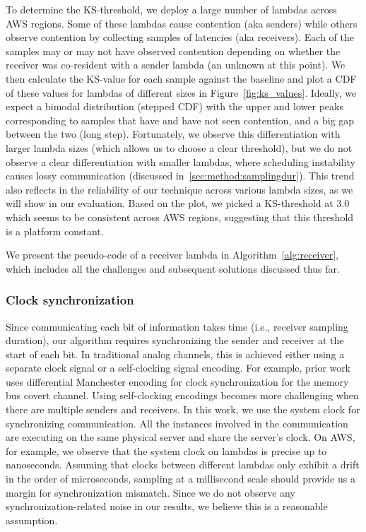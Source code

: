 To determine the KS-threshold, we deploy a large number of lambdas across AWS
regions. Some of these lambdas cause contention (aka senders) while others
observe contention by collecting samples of latencies (aka receivers). Each of
the samples may or may not have observed contention depending on whether the
receiver was co-resident with a sender lambda (an unknown at this point). We then
calculate the KS-value for each sample against the baseline and plot a CDF of
these values for lambdas of different sizes in Figure~\ref{fig:ks_values}.
Ideally, we expect a bimodal distribution (stepped CDF) with the upper and
lower peaks corresponding to samples that have and have not seen contention, and
a big gap between the two (long step). Fortunately, we observe this
differentiation with larger lambda sizes (which allows us to choose a clear
threshold), but we do not observe a clear differentiation with smaller lambdas,
where scheduling instability causes lossy communication (discussed
in~\ref{sec:method:samplingdur}).  This trend also reflects in the reliability
of our technique across various lambda sizes, as we will show in our evaluation.
Based on the plot, we picked a KS-threshold at 3.0 which seems to be consistent
across AWS regions, suggesting that this threshold is a platform constant.

We present the pseudo-code of a receiver lambda in Algorithm~\ref{alg:receiver},
which includes all the challenges and subsequent solutions discussed thus
far.

\subsubsection{Clock synchronization} 
Since communicating each bit of information takes time (i.e., receiver sampling
duration), our algorithm requires synchronizing the sender and receiver at the start
of each bit. In traditional analog channels, this is achieved either using a
separate clock signal or a self-clocking signal encoding. For example, prior
work~\cite{whispers} uses differential Manchester encoding for clock
synchronization for the memory bus covert channel. Using self-clocking encodings
becomes more challenging when there are multiple senders and receivers. In this
work, we use the system clock for synchronizing communication.  All the
instances involved in the communication are executing on the same physical
server and share the server's clock. On AWS, for example, we observe that the
system clock on lambdas is precise up to nanoseconds. 
Assuming that clocks between different lambdas only exhibit a drift in the order
of microseconds, sampling at a millisecond scale should provide us a margin for
synchronization mismatch. Since we do not observe any synchronization-related
noise in our results, we believe this is a reasonable assumption.


